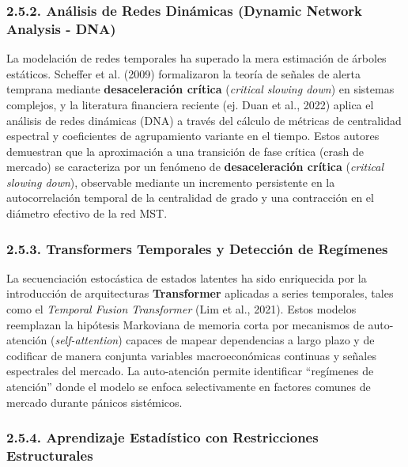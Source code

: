 \documentclass[
  12pt,
]{article}
\begin{document}
\subsubsection{2.5.2. Análisis de Redes Dinámicas (Dynamic Network
Analysis -
DNA)}\label{anuxe1lisis-de-redes-dinuxe1micas-dynamic-network-analysis---dna}

La modelación de redes temporales ha superado la mera estimación de
árboles estáticos. Scheffer et al. (2009) formalizaron la teoría de señales de alerta temprana mediante \textbf{desaceleración crítica} (\emph{critical slowing down}) en sistemas complejos, y la literatura financiera reciente (ej. Duan et al., 2022) aplica el análisis de redes dinámicas (DNA) a través del cálculo de
métricas de centralidad espectral y coeficientes de agrupamiento
variante en el tiempo. Estos autores demuestran que la aproximación a
una transición de fase crítica (crash de mercado) se caracteriza por un
fenómeno de \textbf{desaceleración crítica} (\emph{critical slowing
down}), observable mediante un incremento persistente en la
autocorrelación temporal de la centralidad de grado y una contracción en
el diámetro efectivo de la red MST.

\subsubsection{2.5.3. Transformers Temporales y Detección de
Regímenes}\label{transformers-temporales-y-detecciuxf3n-de-reguxedmenes}

La secuenciación estocástica de estados latentes ha sido enriquecida por
la introducción de arquitecturas \textbf{Transformer} aplicadas a series
temporales, tales como el \emph{Temporal Fusion Transformer} (Lim et
al., 2021). Estos modelos reemplazan la hipótesis Markoviana de memoria
corta por mecanismos de auto-atención (\emph{self-attention}) capaces de
mapear dependencias a largo plazo y de codificar de manera conjunta
variables macroeconómicas continuas y señales espectrales del mercado.
La auto-atención permite identificar ``regímenes de atención'' donde el
modelo se enfoca selectivamente en factores comunes de mercado durante
pánicos sistémicos.

\subsubsection{2.5.4. Aprendizaje Estadístico con Restricciones
Estructurales}\label{aprendizaje-estaduxedstico-con-restricciones-estructurales}
\end{document}
